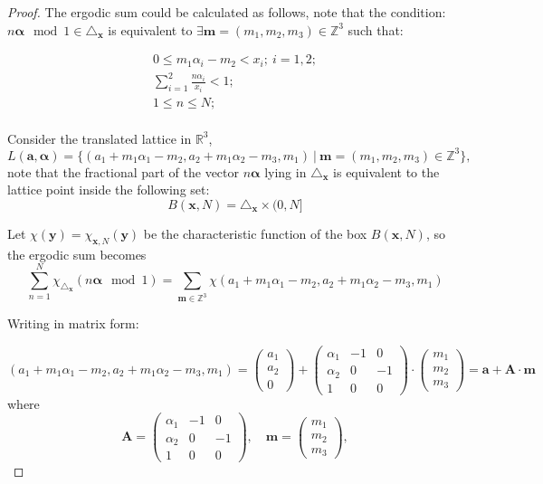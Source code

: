 \documentclass[11pt]{article}
\newcommand{\fc}{\frac}
\renewcommand{\a}{\alpha}
\renewcommand{\(}{\left(}
\renewcommand{\)}{\right)}
\renewcommand{\bf}{\mathbf}
\newcommand{\tria}{\triangle_{\bf{x}}}
\newcommand{\<}{\langle}
\renewcommand{\>}{\rangle}
\begin{document}
\begin{proof}
The ergodic sum could be calculated as follows, note that the condition:
$n\bm{\a} \mod 1 \in \tria$ is equivalent to $\exists \bf{m}=(m_1, m_2, m_3)\in \mathbb{Z}^3$ such that: 

$$
\begin{array}{c} 

0\le m_1\alpha_i  -m_2 <x_i ; \ i=1,2;\\
\sum_{i=1}^{2}\fc{n\a_i}{x_i}< 1; \\
1\le n \le N; \\
\end{array}
$$

Consider the translated lattice in $\mathbb{R}^3$, 
$$ 
L(\bm{a}, \bm{\a})=\{(a_1+m_1\alpha_1 - m_2, a_2+ m_1 \a_2 -m_3, m_1) \ | \ \bf{m}=(m_1,m_2,m_3)\in \mathbb{Z}^3 \},
$$
note that the fractional part of the vector $n\bm{\a}$ lying in $\tria $ is equivalent to the lattice point inside the following set: $$B(\bf{x},N)= \tria \times (0,N]$$


Let $\chi(\bf{y})=\chi_{\bf{x},N}(\bf{y})$ be the characteristic function of the box $B(\bf{x},N)$, so the ergodic sum becomes 
$$\sum \limits_{n =1}^N \chi_{\tria}(n\bm{\alpha}\mod 1)=\sum \limits_{\bf{m} \in \mathbb{Z}^3 }\chi(a_1+m_1\alpha_1-m_2, a_2+m_1\alpha_2-m_3, m_1)
$$

Writing in matrix form:

$$
(a_1+m_1\alpha_1-m_2, a_2+m_1\alpha_2-m_3, m_1)=\left( \begin{matrix} a_1\\ a_2\\ 0 \end{matrix}\right) + \left( \begin{matrix} \a_1 &  -1  & 0 \\ \a_2 & 0 & -1 \\ 1 & 0 & 0 \end{matrix}\right) \cdot \left( \begin{matrix} m_1 \\m_2 \\m_3 \end{matrix} \right)=\bm{a}+\bf{A}\cdot \bf{m}
$$
where
$$
\bf{A}=\left( \begin{matrix} \alpha_1 &  -1 & 0 \\\a_2 & 0 & -1 \\1 & 0 & 0 \end{matrix}\right), \quad \bf{m}=\left( \begin{matrix} m_1 \\m_2 \\m_3 \end{matrix} \right), 
$$


\end{proof}
\end{document}
